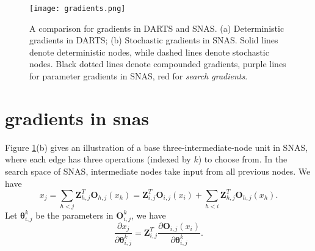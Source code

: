 \documentclass{article} \usepackage{iclr2019_conference,times}
\newcommand{\zh}{\color{black}}
\begin{document}
\begin{figure}[h]
  \centering
  \texttt{[image: gradients.png]}
  \caption{A comparison for gradients in DARTS and SNAS. (a) Deterministic gradients in DARTS; (b) Stochastic gradients in SNAS. Solid lines denote deterministic nodes, while dashed lines denote stochastic nodes. Black {\zh dotted} lines denote compounded gradients, purple lines for parameter gradients in SNAS, red for \textit{search gradients}. }
  \label{fig:snas_vs_darts}
\end{figure}

\section{gradients in snas}
Figure \ref{fig:snas_vs_darts}(b) gives an illustration of a base three-intermediate-node unit in SNAS, where each edge has three operations (indexed by $k$) to choose from. In the search space of SNAS, intermediate nodes take input from all previous nodes. We have 
\begin{equation}
x_{j} = \sum_{h<j}\bm{Z}_{h,j}^{T}\bm{O}_{h,j}(x_{h}) = \bm{Z}_{i,j}^{T}\bm{O}_{i,j}(x_{i})+\sum_{h<i}\bm{Z}_{h,j}^{T}\bm{O}_{h,j}(x_{h}). 
\end{equation}
Let $\bm{\theta}_{i,j}^{k}$ be the parameters in $\bm{O}_{i,j}^{k}$, we have 
\begin{equation}
\frac{\partial x_{j}}{\partial \bm{\theta}_{i,j}^{k}} = \bm{Z}_{i,j}^{T} \frac{\partial \bm{O}_{i,j}(x_{i})}{\partial \bm{\theta}_{i,j}^{k}}.
\end{equation}
\end{document}
